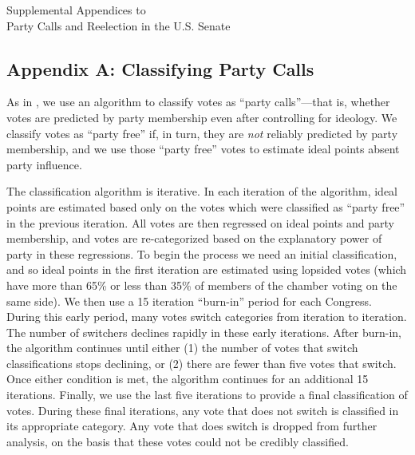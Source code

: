 \documentclass[12pt]{article}
\begin{document}
\doublespacing

\setcounter{table}{0}
\setcounter{footnote}{0}
\setcounter{figure}{0}
\setcounter{page}{0}


\begin{center}
\vspace*{1in}
{\Large Supplemental Appendices to\\}
{\LARGE Party Calls and Reelection in the U.S. Senate}
\end{center}
\vspace*{1in}

\thispagestyle{empty}

\setcounter{tocdepth}{1}
\setcounter{secnumdepth}{0}
\tableofcontents

\renewcommand\thetable{A\arabic{table}}
\renewcommand\thepage{A\arabic{page}}

\clearpage

\subsection*{Appendix A: Classifying Party Calls}
%

As in \cite{Minozzi:2013}, we use an algorithm to classify votes as ``party calls''---that is, whether votes are predicted by party membership even after controlling for ideology.  We classify votes as ``party free'' if, in turn, they are \textit{not} reliably predicted by party membership, and we use those ``party free'' votes to estimate ideal points absent party influence.

The classification algorithm is iterative.  In each iteration of the algorithm, ideal points are estimated based only on the votes which were classified as ``party free'' in the previous iteration.  All votes are then regressed on ideal points and party membership, and votes are re-categorized based on the explanatory power of party in these regressions.  To begin the process we need an initial classification, and so ideal points in the first iteration are estimated using lopsided votes (which have more than 65\% or less than 35\% of members of the chamber voting on the same side).  We then use a 15 iteration ``burn-in'' period for each Congress.
During this early period, many votes switch categories from iteration to iteration.
The number of switchers declines rapidly in these early iterations.
After burn-in, the algorithm continues until either (1) the number of votes that switch classifications stops declining, or (2) there are fewer than five votes that switch.  Once either condition is met, the algorithm continues for an additional 15 iterations.  Finally, we use the last five iterations to provide a final classification of votes. During these final iterations, any vote that does not switch is classified in its appropriate category.  Any vote that does switch is dropped from further analysis, on the basis that these votes could not be credibly classified.
\end{document}
